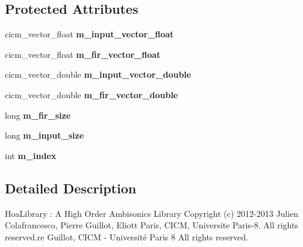\subsection*{Protected Attributes}
\begin{DoxyCompactItemize}
\item 
\hypertarget{class_filter_fir_a204586c6c22187d03c92346566f68944}{cicm\-\_\-vector\-\_\-float {\bfseries m\-\_\-input\-\_\-vector\-\_\-float}}\label{class_filter_fir_a204586c6c22187d03c92346566f68944}

\item 
\hypertarget{class_filter_fir_a792605ba286cd9a3b8ea7b612459ea1c}{cicm\-\_\-vector\-\_\-float {\bfseries m\-\_\-fir\-\_\-vector\-\_\-float}}\label{class_filter_fir_a792605ba286cd9a3b8ea7b612459ea1c}

\item 
\hypertarget{class_filter_fir_a20a039f8b4d1dbf4b46b47eedf824aed}{cicm\-\_\-vector\-\_\-double {\bfseries m\-\_\-input\-\_\-vector\-\_\-double}}\label{class_filter_fir_a20a039f8b4d1dbf4b46b47eedf824aed}

\item 
\hypertarget{class_filter_fir_a87ef3193899057d49eead0b4c55fec1b}{cicm\-\_\-vector\-\_\-double {\bfseries m\-\_\-fir\-\_\-vector\-\_\-double}}\label{class_filter_fir_a87ef3193899057d49eead0b4c55fec1b}

\item 
\hypertarget{class_filter_fir_a70cae5301d675bbe832c909f022970e3}{long {\bfseries m\-\_\-fir\-\_\-size}}\label{class_filter_fir_a70cae5301d675bbe832c909f022970e3}

\item 
\hypertarget{class_filter_fir_a87367acd803abc67b181105aaf7d8a4c}{long {\bfseries m\-\_\-input\-\_\-size}}\label{class_filter_fir_a87367acd803abc67b181105aaf7d8a4c}

\item 
\hypertarget{class_filter_fir_adfcca9b4de9698e5fab8c0de8f51b7be}{int {\bfseries m\-\_\-index}}\label{class_filter_fir_adfcca9b4de9698e5fab8c0de8f51b7be}

\end{DoxyCompactItemize}


\subsection{Detailed Description}
Hoa\-Library \-: A High Order Ambisonics Library Copyright (c) 2012-\/2013 Julien Colafrancesco, Pierre Guillot, Eliott Paris, C\-I\-C\-M, Universite Paris-\/8. All rights reserved.\-re Guillot, C\-I\-C\-M -\/ Université Paris 8 All rights reserved.

